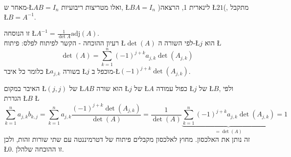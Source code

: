 \documentclass[english,hebrew]{article}
\begin{document}
מאחר ש-\L{$AB=I_{n}$} ואלו מטריצות ריבועיות, \L{$BA=I_{n}$} )לינארית
1, הרצאה \L{$21$}(, מתקבל \L{$B=A^{-1}$}.

זו הנוסחה \L{$A^{-1}=\frac{1}{\det A}\text{adj}(A)$}.\\

רעיון ההוכחה - הקשר לפיתוח לפלס: פיתוח \L{$\det(A)$} לפי השורה ה-\L{$j$}
הוא \L{%
\[
\det(A)=\sum_{k=1}^{n}\left(-1\right)^{j+k}a_{j,k}\det\left(A_{j,k}\right)
\]
}%
כלומר כל איבר \L{$a_{j,k}$} בשורה \L{$j$} מוכפל ב-\L{$\left(-1\right)^{j+k}\det\left(A_{j,k}\right)$}.

האיבר במקום \L{$\left(j,j\right)$} של \L{$AB$} הוא שורה \L{$j$}
של \L{$A$} כפול עמודה \L{$j$} של \L{$B$}, ולפי הגדרת \L{$B$} \L{%
\[
\sum_{k=1}^{n}a_{j,k}b_{k,j}=\sum_{k=1}^{n}a_{j,k}\frac{\left(-1\right)^{j+k}\det\left(A_{j,k}\right)}{\det(A)}=\frac{1}{\det(A)}\underset{=\det(A)}{\underbrace{\sum_{k=1}^{n}\left(-1\right)^{j+k}a_{j,k}\det\left(A_{j,k}\right)}}=1
\]
}%
זה נותן את האלכסון. מחוץ לאלכסון מקבלים פיתוח של דטרמיננטה עם שתי
שורות זהות, ולכן \L{$0$}. זו ההוכחה שלהלן.
\end{document}
